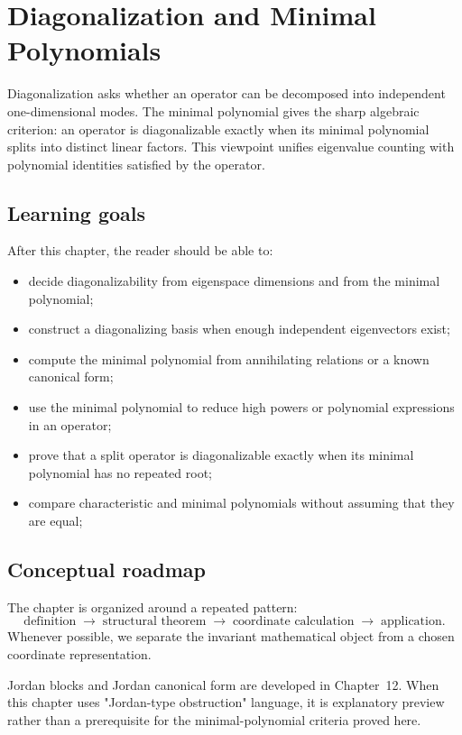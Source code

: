 \chapter{Diagonalization and Minimal Polynomials}
\label{ch:i11-diagonalization-and-minimal-polynomials}

Diagonalization asks whether an operator can be decomposed into independent one-dimensional modes. The minimal polynomial gives the sharp algebraic criterion: an operator is diagonalizable exactly when its minimal polynomial splits into distinct linear factors. This viewpoint unifies eigenvalue counting with polynomial identities satisfied by the operator.

\section*{Learning goals}
After this chapter, the reader should be able to:
\begin{itemize}
\item decide diagonalizability from eigenspace dimensions and from the minimal polynomial;
\item construct a diagonalizing basis when enough independent eigenvectors exist;
\item compute the minimal polynomial from annihilating relations or a known canonical form;
\item use the minimal polynomial to reduce high powers or polynomial expressions in an operator;
\item prove that a split operator is diagonalizable exactly when its minimal polynomial has no repeated root;
\item compare characteristic and minimal polynomials without assuming that they are equal;
\end{itemize}
\section*{Conceptual roadmap}
The chapter is organized around a repeated pattern:
\[
\boxed{\text{definition}\;\longrightarrow\;\text{structural theorem}\;\longrightarrow\;\text{coordinate calculation}\;\longrightarrow\;\text{application}.}
\]
Whenever possible, we separate the invariant mathematical object from a chosen coordinate representation.

\begin{remark}
Jordan blocks and Jordan canonical form are developed in Chapter~12. When this
chapter uses "Jordan-type obstruction" language, it is explanatory preview
rather than a prerequisite for the minimal-polynomial criteria proved here.
\end{remark}

